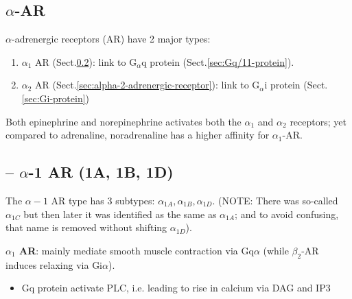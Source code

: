 \subsection{$\alpha$-AR}
\label{sec:alpha-adrenergic-receptor}

$\alpha$-adrenergic receptors (AR) have 2 major types:
\begin{enumerate}
  \item $\alpha_1$ AR (Sect.\ref{sec:alpha-1-adrenergic-receptor}): link to
  G$_\alpha$q protein (Sect.\ref{sec:Gq/11-protein}).
  
  
  \item $\alpha_2$ AR (Sect.\ref{sec:alpha-2-adrenergic-receptor}): link to
  G$_\alpha$i protein (Sect.\ref{sec:Gi-protein})
\end{enumerate}
Both epinephrine and norepinephrine activates both the $\alpha_1$ and $\alpha_2$
receptors; yet compared to adrenaline, noradrenaline has a higher affinity for
$\alpha_1$-AR.

\subsection{-- $\alpha$-1 AR (1A, 1B, 1D)}
\label{sec:alpha-1-adrenergic-receptor}

The $\alpha-1$ AR type has 3 subtypes: $\alpha_{1A}, \alpha_{1B}, \alpha_{1D}$.
(NOTE: There was so-called $\alpha_{1C}$ but then later it was identified as
the same as $\alpha_{1A}$; and to avoid confusing, that name is removed without
shifting $\alpha_{1D}$).
 

{\bf $\alpha_1$ AR}: mainly mediate smooth muscle contraction via
Gq$\alpha$ (while $\beta_2$-AR induces relaxing via Gi$\alpha$).
\begin{itemize}
  \item Gq protein activate PLC, i.e. leading to rise in calcium via DAG and IP3
\end{itemize}

